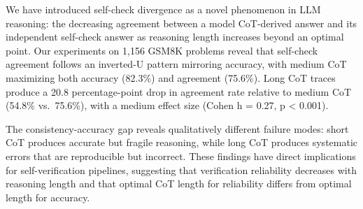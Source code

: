 \documentclass[11pt,letterpaper]{article}
\begin{document}
We have introduced self-check divergence as a novel phenomenon in LLM reasoning: the decreasing agreement between a model CoT-derived answer and its independent self-check answer as reasoning length increases beyond an optimal point. Our experiments on 1,156 GSM8K problems reveal that self-check agreement follows an inverted-U pattern mirroring accuracy, with medium CoT maximizing both accuracy (82.3\%) and agreement (75.6\%). Long CoT traces produce a 20.8 percentage-point drop in agreement rate relative to medium CoT (54.8\% vs.\ 75.6\%), with a medium effect size (Cohen h = 0.27, p < 0.001).

The consistency-accuracy gap reveals qualitatively different failure modes: short CoT produces accurate but fragile reasoning, while long CoT produces systematic errors that are reproducible but incorrect. These findings have direct implications for self-verification pipelines, suggesting that verification reliability decreases with reasoning length and that optimal CoT length for reliability differs from optimal length for accuracy.



\end{document}
